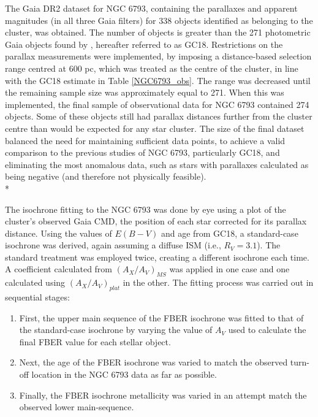 \documentclass[12pt, a4paper]{report}
\begin{document}
The Gaia DR2 dataset for NGC 6793, containing the parallaxes and apparent magnitudes (in all three Gaia filters) for 338 objects identified as belonging to the cluster, was obtained. The number of objects is greater than the 271 photometric Gaia objects found by \cite{2018A&A...616A..10G}, hereafter referred to as GC18. Restrictions on the parallax measurements were implemented, by imposing a distance-based selection range centred at 600 pc, which was treated as the centre of the cluster, in line with the GC18 estimate in Table \ref{NGC6793_obs}. The range was decreased until the remaining sample size was approximately equal to 271. When this was implemented, the final sample of observational data for NGC 6793 contained 274 objects. Some of these objects still had parallax distances further from the cluster centre than would be expected for any star cluster. The size of the final dataset balanced the need for maintaining sufficient data points, to achieve a valid comparison to the previous studies of NGC 6793, particularly GC18, and eliminating the most anomalous data, such as stars with parallaxes calculated as being negative (and therefore not physically feasible).\\*

The isochrone fitting to the NGC 6793 was done by eye using a plot of the cluster's observed Gaia CMD, the position of each star corrected for its parallax distance. Using the values of $E(B-V)$ and age from GC18, a standard-case isochrone was derived, again assuming a diffuse ISM (i.e., $R_{V} = 3.1$). The standard treatment was employed twice, creating a different isochrone each time. A coefficient calculated from $(A_{X}/A_{V})_{MS}$ was applied in one case and one calculated using $(A_{X}/A_{V})_{plat}$ in the other. The fitting process was carried out in sequential stages:

\begin{enumerate}
\item First, the upper main sequence of the FBER isochrone was fitted to that of the standard-case isochrone by varying the value of $A_{V}$ used to calculate the final FBER value for each stellar object.
\item Next, the age of the FBER isochrone was varied to match the observed turn-off location in the NGC 6793 data as far as possible.
\item Finally, the FBER isochrone metallicity was varied in an attempt match the observed lower main-sequence.
\end{enumerate}
\end{document}
